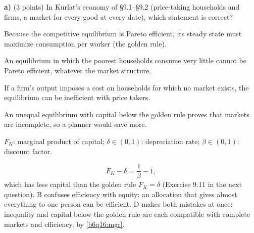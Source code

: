 

\textbf{a)} (3 points) In Kurlat's economy of \S9.1--\S9.2 (price-taking households and firms, a market for every good at every
date), which statement is correct?
\begin{alternativas}
\item Because the competitive equilibrium is Pareto efficient, its steady state must maximize consumption per worker (the golden rule).
\item An equilibrium in which the poorest households consume very little cannot be Pareto efficient, whatever the market structure.
\item If a firm's output imposes a cost on households for which no market exists, the equilibrium can be inefficient with price takers.
\item An unequal equilibrium with capital below the golden rule proves that markets are incomplete, so a planner would save more.
\end{alternativas}
\begin{sol}
\begin{notacao}
\item $F_K$: marginal product of capital; $\delta\in(0,1)$: depreciation rate; $\beta\in(0,1)$: discount factor.
\end{notacao}
\begin{equation}
F_K-\delta=\frac1\beta-1, \label{b6q16:mgr}
\end{equation}
which has less capital than the golden rule $F_K=\delta$ (Exercise 9.11 in the next question). B confuses efficiency with
equity: an allocation that gives almost everything to one person can be efficient. D makes both mistakes at once: inequality and
capital below the golden rule are each compatible with complete markets and efficiency, by \eqref{b6q16:mgr}.
\end{sol}

